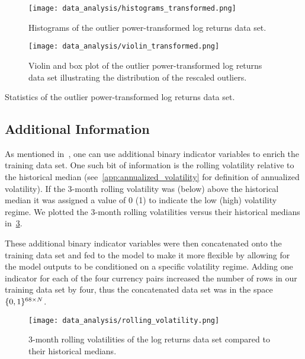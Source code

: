 \begin{figure}[!htb]
    \begin{center}
        \texttt{[image: data\_analysis/histograms\_transformed.png]}
    \end{center}
    \caption{Histograms of the outlier power-transformed log returns data set.}
    \label{fig:histograms_transformed}
\end{figure}
\begin{figure}[!htb]
    \begin{center}
        \texttt{[image: data\_analysis/violin\_transformed.png]}
    \end{center}
    \caption{Violin and box plot of the outlier power-transformed log returns data set illustrating the distribution of the rescaled outliers.}
    \label{fig:violin_transformed}
\end{figure}
\begin{table}[!htb]
    \centering
    \begin{adjustbox}{max width=\textwidth}
        
    \end{adjustbox}
    \caption{Statistics of the outlier power-transformed log returns data set.}
    \label{tbl:data_log_returns_transformed_stats}
\end{table}

\subsection{Additional Information}
As mentioned in~\cite{kondratyev_2019}, one can use additional binary indicator variables to enrich the training data set.
One such bit of information is the rolling volatility relative to the historical median (see~\cref{app:annualized_volatility} for definition of annualized volatility).
If the 3-month rolling volatility was (below) above the historical median it was assigned a value of 0 (1) to indicate the low (high) volatility regime.
We plotted the 3-month rolling volatilities versus their historical medians in~\cref{fig:rolling_volatility}.

These additional binary indicator variables were then concatenated onto the training data set and fed to the model to make it more flexible by allowing for the model outputs to be conditioned on a specific volatility regime.
Adding one indicator for each of the four currency pairs increased the number of rows in our training data set by four, thus the concatenated data set was in the space \( \{0,1\}^{68 \times N} \).

\begin{figure}[!htb]
    \begin{center}
        \texttt{[image: data\_analysis/rolling\_volatility.png]}
    \end{center}
    \caption{3-month rolling volatilities of the log returns data set compared to their historical medians.}
    \label{fig:rolling_volatility}
\end{figure}

